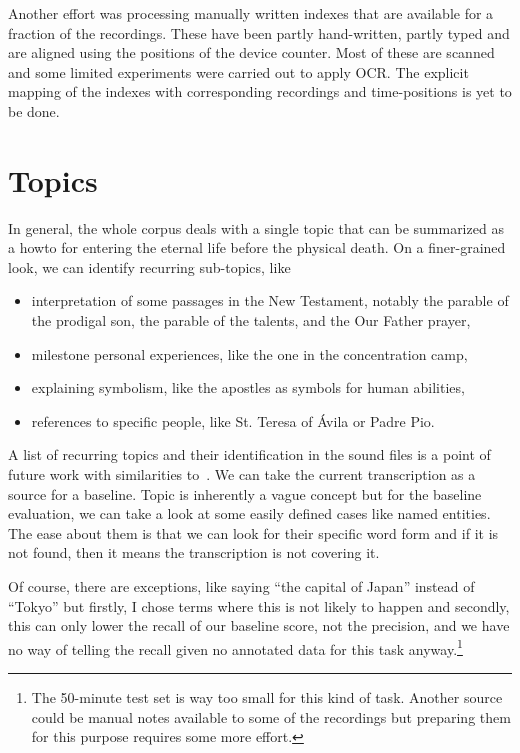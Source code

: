 \documentclass[a4paper,11pt]{article}
\begin{document}
Another effort was processing manually written indexes that are available for a
fraction of the recordings. These have been partly hand-written, partly typed
and are aligned using the positions of the device counter. Most of these are
scanned and some limited experiments were carried out to apply OCR. The explicit
mapping of the indexes with corresponding recordings and time-positions is yet
to be done.

\section{Topics}

In general, the whole corpus deals with a single topic that can be summarized as
a howto for entering the eternal life before the physical death. On a
finer-grained look, we can identify recurring sub-topics, like

\begin{itemize}
\item{interpretation of some passages in the New Testament, notably the parable
of the prodigal son, the parable of the talents, and the Our Father prayer,}
\item{milestone personal experiences, like the one in the concentration camp,}
\item{explaining symbolism, like the apostles as symbols for human abilities,}
\item{references to specific people, like St. Teresa of \'{A}vila or Padre Pio.}
\end{itemize}

A list of recurring topics and their identification in the sound files is a
point of future work with similarities to~\cite{skorkovska2011automatic}.
We can take the current transcription %
as a source for a baseline.
Topic is inherently a vague concept %
but for the baseline evaluation, we can take a look at some easily defined cases
like named entities. The ease about them is that we can look for their specific
word form and if it is not found, then it means the transcription is not
covering it.

Of course, there are exceptions, like saying ``the capital of Japan'' instead of
``Tokyo'' but firstly, I chose terms where this is not likely to happen and
secondly, this can only lower the recall of our baseline score, not the
precision, and we have no way of telling the recall given no annotated data
for this task anyway.\footnote{The 50-minute test set is way too small for this
kind of task. Another source could be manual notes available to some of the
recordings but preparing them for this purpose requires some more effort.}
\end{document}
